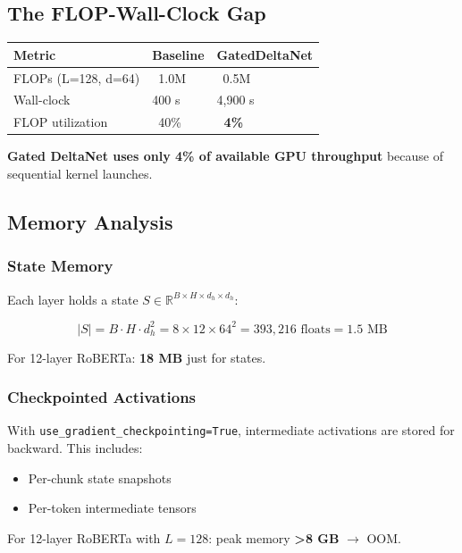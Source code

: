 \subsection{The FLOP-Wall-Clock Gap}

\begin{table}[H]
\centering
\small
\begin{tabular}{lll}
\toprule
\textbf{Metric} & \textbf{Baseline} & \textbf{GatedDeltaNet} \\
\midrule
FLOPs (L=128, d=64) & ~1.0M & ~0.5M \\
Wall-clock & 400  s & 4,900  s \\
FLOP utilization & ~40\% & \textbf{~4\%} \\
\bottomrule
\end{tabular}
\end{table}

\textbf{Gated DeltaNet uses only 4\% of available GPU throughput} because of 
sequential kernel launches.

\subsection{Memory Analysis}

\subsubsection{State Memory}

Each layer holds a state $S \in \mathbb{R}^{B \times H \times d_h \times d_h}$:

\[
|S| = B \cdot H \cdot d_h^2 = 8 \times 12 \times 64^2 = 393,216 \text{ floats} 
= 1.5 \text{ MB}
\]

For 12-layer RoBERTa: \textbf{18 MB} just for states.

\subsubsection{Checkpointed Activations}

With \texttt{use\_gradient\_checkpointing=True}, intermediate activations are stored 
for backward. This includes:
\begin{itemize}
\item Per-chunk state snapshots
\item Per-token intermediate tensors

\end{itemize}
For 12-layer RoBERTa with $L=128$: peak memory \textbf{>8 GB} $\to$ OOM.

